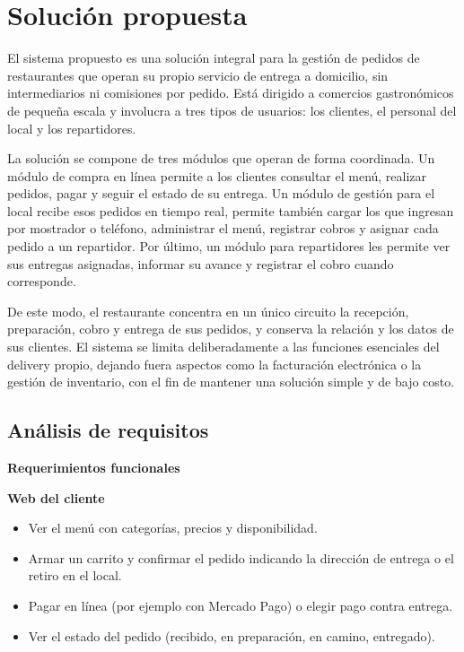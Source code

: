 \documentclass[12pt,a4paper]{report}
\begin{document}
\chapter{Solución propuesta}
\begin{justify}
El sistema propuesto es una solución integral para la gestión de pedidos de restaurantes que operan su propio servicio de entrega a domicilio, sin intermediarios ni comisiones por pedido. Está dirigido a comercios gastronómicos de pequeña escala y involucra a tres tipos de usuarios: los clientes, el personal del local y los repartidores.

La solución se compone de tres módulos que operan de forma coordinada. Un módulo de compra en línea permite a los clientes consultar el menú, realizar pedidos, pagar y seguir el estado de su entrega. Un módulo de gestión para el local recibe esos pedidos en tiempo real, permite también cargar los que ingresan por mostrador o teléfono, administrar el menú, registrar cobros y asignar cada pedido a un repartidor. Por último, un módulo para repartidores les permite ver sus entregas asignadas, informar su avance y registrar el cobro cuando corresponde.

De este modo, el restaurante concentra en un único circuito la recepción, preparación, cobro y entrega de sus pedidos, y conserva la relación y los datos de sus clientes. El sistema se limita deliberadamente a las funciones esenciales del delivery propio, dejando fuera aspectos como la facturación electrónica o la gestión de inventario, con el fin de mantener una solución simple y de bajo costo.
\end{justify}
	
\newpage
\section{Análisis de requisitos}
\vspace{0.5cm}
\begin{center}
\textbf{Requerimientos funcionales}
\end{center}
\vspace{0.5cm}
\textbf{Web del cliente}
\begin{itemize}
	\item Ver el menú con categorías, precios y disponibilidad.
	\item Armar un carrito y confirmar el pedido indicando la dirección de entrega o el retiro en el local.
	\item Pagar en línea (por ejemplo con Mercado Pago) o elegir pago contra entrega.
	\item Ver el estado del pedido (recibido, en preparación, en camino, entregado).
\end{itemize}
\end{document}
